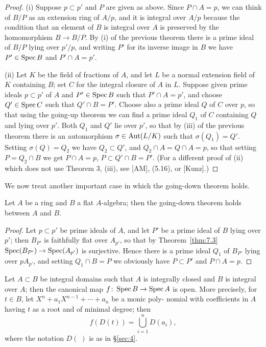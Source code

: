 \begin{proof}
(i) Suppose $p \subset p'$ and $P$ are given as above. Since $P \cap A = p$, we can
think of $B/P$ as an extension ring of $A/p$, and it is integral over $A/p$ because
the condition that an element of $B$ is integral over $A$ is preserved by the
homomorphism $B \to B/P$. By (i) of the previous theorem there is a prime
ideal of $B/P$ lying over $p'/p$, and writing $P'$ for its inverse image in $B$ we have
$P' \in \operatorname{Spec} B$ and $P' \cap A = p'$.

(ii) Let $K$ be the field of fractions of $A$, and let $L$ be a normal extension
field of $K$ containing $B$; set $C$ for the integral closure of $A$ in $L$. Suppose
given prime ideals $p \subset p'$ of $A$ and $P' \in \operatorname{Spec} B$ such that $P' \cap A = p'$, and
choose $Q' \in \operatorname{Spec} C$ such that $Q' \cap B = P'$. Choose also a prime ideal $Q$ of $C$
over $p$, so that using the going-up theorem we can find a prime ideal $Q_1$ of $C$
containing $Q$ and lying over $p'$. Both $Q_1$ and $Q'$ lie over $p'$, so that by (iii) of
the previous theorem there is an automorphism $\sigma \in \operatorname{Aut}(L/K)$ such that
$\sigma(Q_1) = Q'$. Setting $\sigma(Q) = Q_2$ we have $Q_2 \subset Q'$, and $Q_2 \cap A = Q \cap A = p$,
so that setting $P = Q_2 \cap B$ we get $P \cap A = p$, $P \subset Q' \cap B = P'$. (For
a different proof of (ii) which does not use Theorem 3, (iii), see [AM], (5.16),
or [Kunz].)
\end{proof}

We now treat another important case in which the going-down theorem
holds.

\begin{theorem}\label{thm:9.5}
Let $A$ be a ring and $B$ a flat $A$-algebra; then the going-down
theorem holds between $A$ and $B$.
\end{theorem}

\begin{proof}
Let $p \subset p'$ be prime ideals of $A$, and let $P'$ be a prime ideal of $B$ lying
over $p'$; then $B_{P'}$ is faithfully flat over $A_{p'}$, so that by Theorem~\ref{thm:7.3}
$\operatorname{Spec}(B_{P'}) \to \operatorname{Spec}(A_{p'})$ is surjective. Hence there is a prime ideal $Q_1$
of $B_{P'}$ lying over $pA_{p'}$, and setting $Q_1 \cap B = P$ we obviously have $P \subset P'$
and $P \cap A = p$.
\end{proof}

\begin{theorem}\label{thm:9.6}
Let $A \subset B$ be integral domains such that $A$ is integrally closed
and $B$ is integral over $A$; then the canonical map $f\colon \operatorname{Spec} B \to \operatorname{Spec} A$ is
open. More precisely, for $t \in B$, let $X^n + a_1X^{n-1} + \cdots + a_n$ be a monic poly-
nomial with coefficients in $A$ having $t$ as a root and of minimal degree; then
\[
  f(D(t)) = \bigcup_{i=1}^{n} D(a_i),
\]
where the notation $D(\;)$ is as in \S\ref{sec:4}.
\end{theorem}

